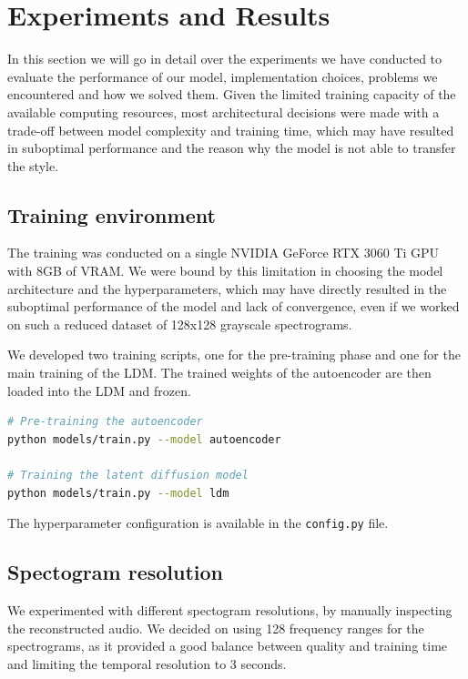 \section{Experiments and Results}

In this section we will go in detail over the experiments we have conducted to evaluate the performance of our model, implementation choices, problems we encountered and how we solved them. Given the limited training capacity of the available computing resources, most architectural decisions were made with a trade-off between model complexity and training time, which may have resulted in suboptimal performance and the reason why the model is not able to transfer the style.

\subsection{Training environment}

The training was conducted on a single NVIDIA GeForce RTX 3060 Ti GPU with 8GB of VRAM. We were bound by this limitation in choosing the model architecture and the hyperparameters, which may have directly resulted in the suboptimal performance of the model and lack of convergence, even if we worked on such a reduced dataset of 128x128 grayscale spectrograms.

\vspace{1em}

\noindent We developed two training scripts, one for the pre-training phase and one for the main training of the LDM. The trained weights of the autoencoder are then loaded into the LDM and frozen.

\begin{lstlisting}[language=bash, basicstyle=\tiny]
# Pre-training the autoencoder
python models/train.py --model autoencoder

# Training the latent diffusion model
python models/train.py --model ldm
\end{lstlisting}

\noindent The hyperparameter configuration is available in the \texttt{config.py} file.


\subsection{Spectogram resolution}

We experimented with different spectogram resolutions, by manually inspecting the reconstructed audio. We decided on using 128 frequency ranges for the spectrograms, as it provided a good balance between quality and training time and limiting the temporal resolution to 3 seconds.

